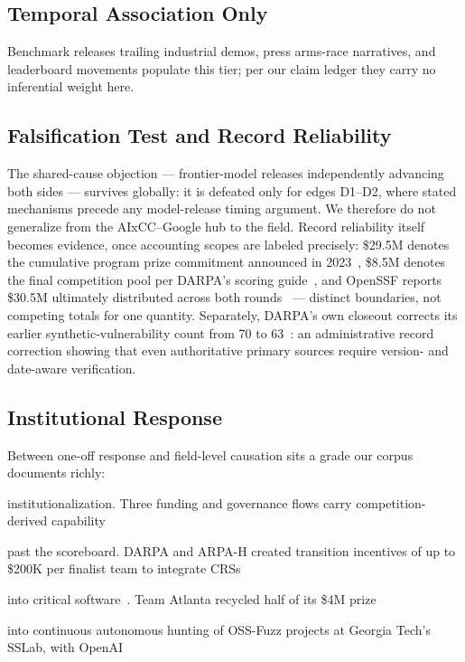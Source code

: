 \documentclass[conference,compsoc]{IEEEtran}
\begin{document}
\subsection{Temporal Association Only}
Benchmark releases trailing industrial demos, press arms-race narratives, and leaderboard
movements populate this tier; per our claim ledger they carry no inferential weight here.

\subsection{Falsification Test and Record Reliability}
The shared-cause objection --- frontier-model releases independently advancing both sides ---
survives globally: it is defeated only for edges D1--D2, where stated mechanisms precede any
model-release timing argument. We therefore do not generalize from the AIxCC--Google hub to the
field. Record reliability itself becomes evidence, once accounting scopes are labeled precisely:
\$29.5M denotes the cumulative program prize commitment announced in 2023~\cite{darpa2023aixcc}, \$8.5M denotes the
final competition pool per DARPA's scoring guide~\cite{darpascoring2025}, and OpenSSF reports
\$30.5M ultimately distributed across both rounds~\cite{openssfaixcc2026} --- distinct
boundaries, not competing totals for one quantity. Separately, DARPA's own closeout corrects
its earlier synthetic-vulnerability count from 70 to 63~\cite{darparesults2025}: an
administrative record correction showing that even authoritative primary sources require
version- and date-aware verification.





\subsection{Institutional Response}

Between one-off response and field-level causation sits a grade our corpus documents richly:

institutionalization. Three funding and governance flows carry competition-derived capability

past the scoreboard. DARPA and ARPA-H created transition incentives of up to \$200K per finalist team to integrate CRSs

into critical software~\cite{darparesults2025}. Team Atlanta recycled half of its \$4M prize

into continuous autonomous hunting of OSS-Fuzz projects at Georgia Tech's SSLab, with OpenAI
\end{document}
